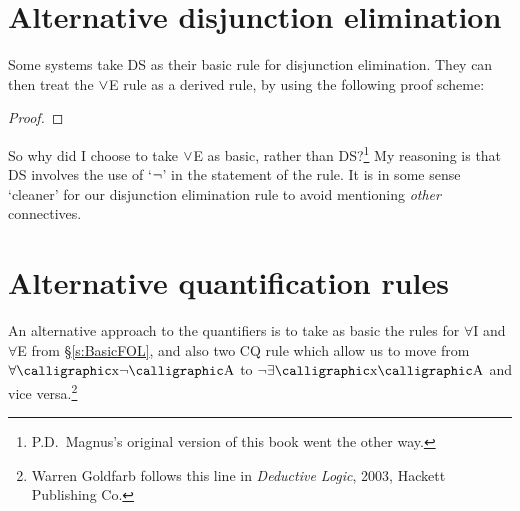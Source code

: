 \section{Alternative disjunction elimination}
Some systems take DS as their basic rule for disjunction elimination. They can then treat the $\vee$E rule as a derived rule, by using the following proof scheme:
	\begin{proof}
		\open
			 {}
		\close
		\open
		\close
		\open
		\close	
		\open
		\open
		\close
	\close
\end{proof}
So why did I choose to take $\vee$E as basic, rather than DS?\footnote{P.D.\ Magnus's original version of this book went the other way.} My reasoning is that DS involves the use of `$\neg$' in the statement of the rule. It is in some sense `cleaner' for our disjunction elimination rule to avoid mentioning \emph{other} connectives. 





\section{Alternative quantification rules}
An alternative approach to the quantifiers is to take as basic the rules for $\forall$I and $\forall$E from \S\ref{s:BasicFOL}, and also two CQ rule which allow us to move from $\forall \meta{x} \enot \meta{A}$ to $\enot \exists \meta{x} \meta{A}$ and vice versa.\footnote{Warren Goldfarb follows this line in \emph{Deductive Logic}, 2003, Hackett Publishing Co.}  

